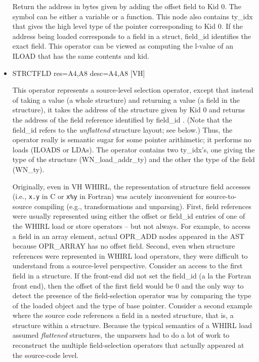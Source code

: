 \begin{itemize}
Return the address in bytes given by adding the offset field to
Kid 0. The symbol can be either a variable or a function. This node
also contains
ty\_idx that gives the high level type of the pointer corresponding
to Kid 0. If the address being loaded corresponds to a field in a
struct, field\_id identifies the exact field. This operator can be
viewed as computing the l-value of an
%
ILOAD that has the same contents and kid.


\item
{}%
STRCTFLD res=A4,A8 desc=A4,A8 \hfill [VH]

This operator represents a source-level selection operator, except
that instead of taking a value (a whole structure) and returning a
value (a field in the structure), it takes the address of the
structure given by Kid 0 and returns the address of the field
reference identified by field\_id .  (Note that the field\_id refers
to the {\em unflattend} structure layout; see below.) Thus, the
operator really is semantic sugar for some pointer arithimetic; it
performs no loads (ILOADS or LDAs).  The operator contains two
ty\_idx's, one giving the type of the structure (WN\_load\_addr\_ty)
and the other the type of the field (WN\_ty).

Originally, even in VH WHIRL, the representation of structure field
accesses (i.e., {\tt x.y} in C or {\tt x\%y} in Fortran) was acutely
inconvenient for source-to-source compiling (e.g., transformations and
unparsing).  First, field references were usually represented using
either the offset or field\_id entries of one of the WHIRL load or store
operators -- but not always.  For example, to access a field in an
array element, actual OPR\_ADD nodes appeared in the AST because
OPR\_ARRAY has no offset field.  Second, even when structure
references were represented in WHIRL load operators, they were
difficult to understand from a source-level perspective.  Consider an
access to the first field in a structure.  If the front-end did not
set the field\_id (a la the Fortran front end), then the offset
of the first field would be 0 and the only way to detect the presence
of the field-selection operator was by comparing the type of the
loaded object and the type of base pointer.  Consider a second example
where the source code references a field in a nested structure, that
is, a structure within a structure.  Because the typical semantics of
a WHIRL load assumed {\em flattened} structures, the unparsers had to
do a lot of work to reconstruct the multiple field-selection operators
that actually appeared at the source-code level.


\end{itemize}
